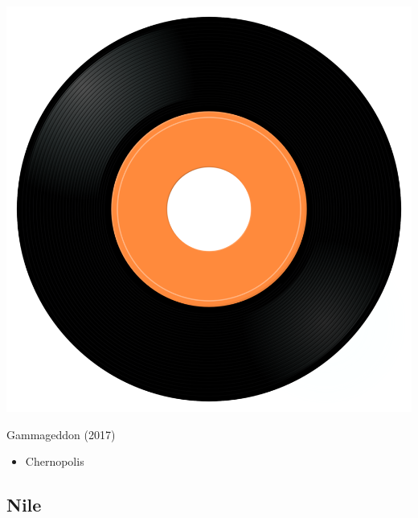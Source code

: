 \begin{minipage}[t]{0.25\textwidth}\vspace{0pt}
\captionsetup{type=figure}
\includegraphics[width=\textwidth]{Images/cover.png}
\caption*{Gammageddon (2017)}
\end{minipage}
\begin{minipage}[t]{0.25\textwidth}\vspace{0pt}
\begin{itemize}[nosep,leftmargin=1em,labelwidth=*,align=left]
	\setlength{\itemsep}{0pt}
	\item Chernopolis
\end{itemize}
\end{minipage}

\subsection{Nile}

